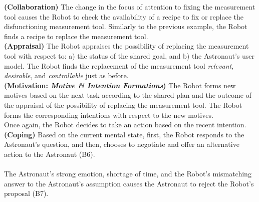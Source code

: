 \noindent\textbf{(Collaboration)} The change in the focus of attention to fixing
the measurement tool causes the Robot to check the availability of a recipe to
fix or replace the disfunctioning measurement tool. Similarly to the previous
example, the Robot finds a recipe to replace the measurement tool.\\

\noindent\textbf{(Appraisal)} The Robot appraises the possibility of replacing
the measurement tool with respect to: a) the status of the shared goal, and b)
the Astronaut's user model. The Robot finds the replacement of the measurement
tool \textit{relevant}, \textit{desirable}, and \textit{controllable} just as
before.\\

\noindent\textbf{(Motivation: \textit{Motive \& Intention Formations})} The
Robot forms new motives based on the next task according to the shared plan and
the outcome of the appraisal of the possibility of replacing the measurement
tool. The Robot forms the corresponding intentions with respect to the new
motives.\\

\noindent Once again, the Robot decides to take an action based on the recent
intention.\\

\noindent\textbf{(Coping)} Based on the current mental state, first, the Robot
responds to the Astronaut's question, and then, chooses to negotiate and offer
an alternative action to the Astronaut (B6).\\

\noindent{}\\

The Astronaut's strong emotion, shortage of time, and the Robot's mismatching
answer to the Astronaut's assumption causes the Astronaut to reject the Robot's
proposal (B7).\\

\noindent{}\\

